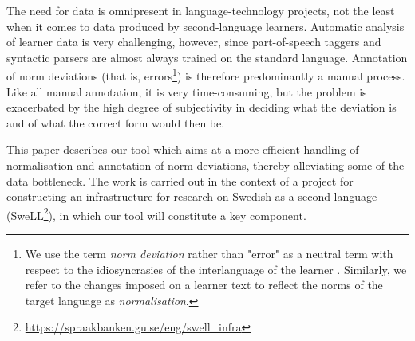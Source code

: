 \documentclass[10pt, a4paper]{article}
\newcommand{\normAnn}[0]{our tool }
\begin{document}
The need for data is omnipresent in language-technology projects, not the least when it comes to data produced by second-language learners.
Automatic analysis of learner data is very challenging, however, since part-of-speech taggers and syntactic parsers are almost always trained on the standard language. Annotation of norm deviations (that is, errors\footnote{We use the term {\em norm deviation} rather than "error" as a neutral term with respect to the idiosyncrasies of the interlanguage of the learner \cite{Selinker1972}. Similarly, we refer to the changes imposed on a learner text to reflect the norms of the target language as {\em normalisation}. }) is therefore predominantly a manual process. Like all manual annotation, it is very time-consuming, but the problem is exacerbated by the high degree of subjectivity in deciding what the deviation is and of what the correct form would then be.

This paper describes %
\normAnn which aims at a more efficient handling of normalisation and annotation of norm deviations, thereby alleviating some of the data bottleneck. The work is carried out in the context of a project for constructing an infrastructure for research on Swedish as a second language (SweLL\footnote{%
{\scriptsize\url{https://spraakbanken.gu.se/eng/swell_infra}}}), in which \normAnn will constitute a key component.


\end{document}
